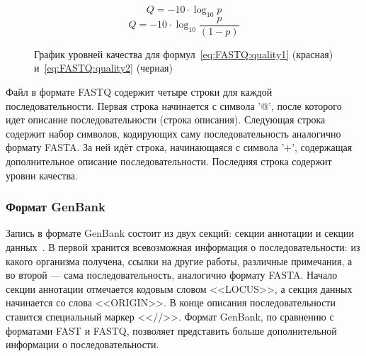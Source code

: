 \begin{equation} \label{eq:FASTQ:quality1}
Q = -10 \cdot \log_{10} p
\end{equation}
\begin{equation} \label{eq:FASTQ:quality2}
Q = -10 \cdot \log_{10} \dfrac{p}{(1-p)}
\end{equation}
\begin{figure}[h]
	\caption{График уровней качества для формул~\ref{eq:FASTQ:quality1} (красная) и~\ref{eq:FASTQ:quality2} (черная)}
	\label{ris:FASTQscore}
\end{figure}

\indent Файл в формате FASTQ содержит четыре строки для каждой последовательности. Первая строка начинается с символа '@', после которого идет описание последовательности (строка описания). Следующая строка содержит набор символов, кодирующих саму последовательность аналогично формату FASTA. За ней идёт строка, начинающаяся с символа '+', содержащая дополнительное описание последовательности. Последняя строка содержит уровни качества. 

\subsubsection[Формат GenBank]{\large Формат GenBank}
\hspace{\parindent} Запись в формате GenBank состоит из двух секций: секции аннотации и секции данных~\cite{GenBankFormat}. В первой хранится всевозможная информация о последовательности: из какого организма получена, ссылки на другие работы, различные примечания, а во второй --- сама последовательность, аналогично формату FASTA. Начало секции аннотации отмечается кодовым словом <<LOCUS>>, а секция данных начинается со слова <<ORIGIN>>. В конце описания последовательности ставится специальный маркер <<//>>. Формат GenBank, по сравнению с форматами FAST и FASTQ, позволяет представить больше дополнительной информации о последовательности.